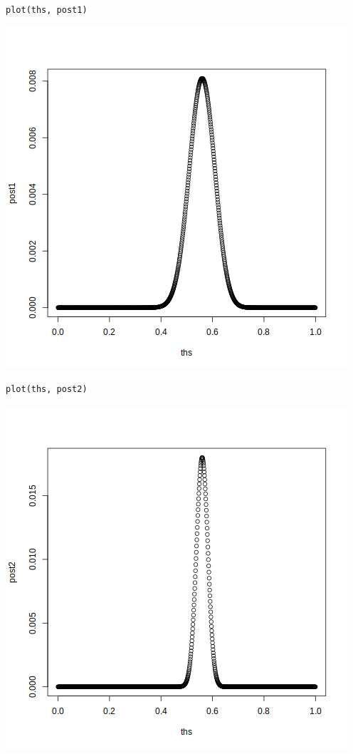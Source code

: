 \documentclass[11pt]{article}
\begin{document}
\begin{verbatim}
plot(ths, post1)
\end{verbatim}

\begin{center}
\includegraphics[width=.9\linewidth]{100.png}
\end{center}

\begin{verbatim}
plot(ths, post2)
\end{verbatim}

\begin{center}
\includegraphics[width=.9\linewidth]{500.png}
\end{center}
\end{document}
